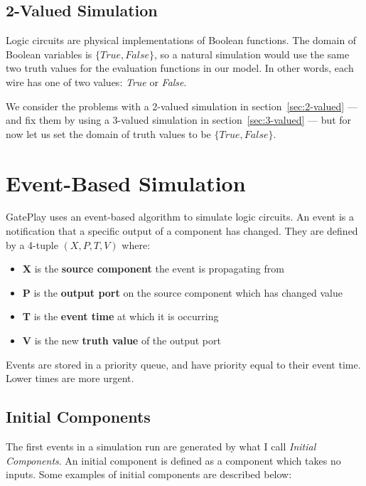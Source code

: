 \subsection{2-Valued Simulation}
Logic circuits are physical implementations of Boolean functions. The domain of Boolean variables is $\{True, False\}$, so a natural simulation would use the same two truth values for the evaluation functions in our model. In other words, each wire has one of two values: \textit{True} or \textit{False}. 

We consider the problems with a 2-valued simulation in section~\ref{sec:2-valued} --- and fix them by using a 3-valued simulation in section~\ref{sec:3-valued} --- but for now let us set the domain of truth values to be $\{True, False\}$.

\section{Event-Based Simulation}
GatePlay uses an event-based algorithm to simulate logic circuits. An event is a notification that a specific output of a component has changed. They are defined by a 4-tuple $(X, P, T, V)$ where:

\begin{itemize}
	\item \textbf{X} is the \textbf{source component} the event is propagating from
	\item \textbf{P} is the \textbf{output port} on the source component which has changed value
	\item \textbf{T} is the \textbf{event time} at which it is occurring
	\item \textbf{V} is the new \textbf{truth value} of the output port
\end{itemize}

Events are stored in a priority queue, and have priority equal to their event time. Lower times are more urgent. 

\subsection{Initial Components}
\label{subsec:initial}
The first events in a simulation run are generated by what I call \textit{Initial Components}. An initial component is defined as a component which takes no inputs. Some examples of initial components are described below:

